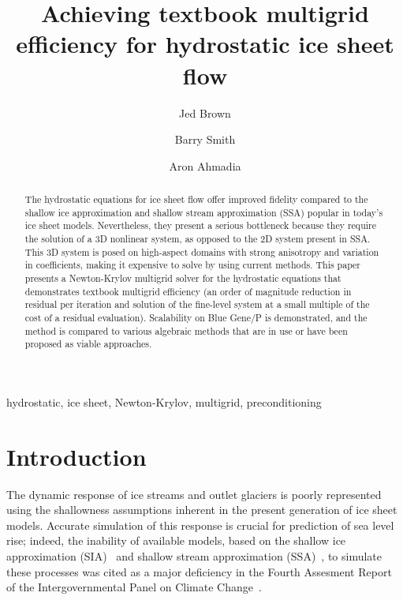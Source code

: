 \documentclass[3p]{elsarticle}
\begin{document}
\begin{frontmatter}
  \title{Achieving textbook multigrid efficiency for hydrostatic ice sheet flow}

  \author[vaw]{Jed Brown} 
  \author[mcs]{Barry Smith} 
  \author[kaust]{Aron Ahmadia} 

  \address[vaw]{Versuchsanstalt f\"ur Wasserbau, Hydrologie und Glaziologie (VAW), ETH Z\"urich, 8092     Z\"urich, Switzerland}
  \address[mcs]{Mathematics and Computer Science Division, Argonne National Laboratory, Argonne, IL     60439}
  \address[kaust]{Supercomputing Laboratory, King Abdullah University of Science and Technology, Thuwal, Makkah, Saudi Arabia}

  \begin{abstract}
    The hydrostatic equations for ice sheet flow offer improved fidelity compared to the shallow ice approximation and shallow stream approximation (SSA) popular in today's ice sheet models. Nevertheless, they present a serious bottleneck because they require the solution of a 3D nonlinear system, as opposed to the 2D system present in SSA.  This 3D system is posed on high-aspect domains with strong anisotropy and variation in coefficients, making it expensive to solve by using current methods.  This paper presents a Newton-Krylov multigrid solver for the hydrostatic equations that demonstrates textbook multigrid efficiency (an order of magnitude reduction in residual per iteration and solution of the fine-level system at a small multiple of the cost of a residual evaluation).  Scalability on Blue Gene/P is demonstrated, and the method is compared to various algebraic methods that are in use or have been proposed as viable approaches.
  \end{abstract}
  \begin{keyword}
    hydrostatic, ice sheet, Newton-Krylov, multigrid, preconditioning
  \end{keyword}
  \thispagestyle{plain}
\end{frontmatter}

\section{Introduction}
The dynamic response of ice streams and outlet glaciers is poorly represented using the shallowness
assumptions inherent in the present generation of ice sheet models.  Accurate simulation of this
response is crucial for prediction of sea level rise; indeed, the inability of available models, based on
the shallow ice approximation (SIA)~\cite{hutter1983tgm} and shallow stream approximation
(SSA)~\cite{morland1987unconfined,weis1999theory}, to simulate these processes was cited as a major
deficiency in the Fourth Assesment Report of the Intergovernmental Panel on Climate Change~\cite{ipcc2007ar4-syr}.
\end{document}
